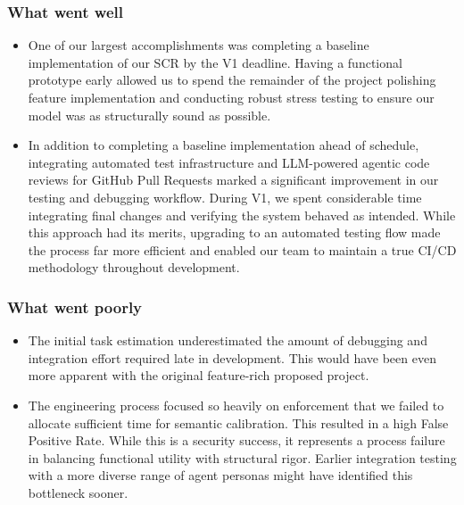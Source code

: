 \documentclass[conference]{IEEEtran}
\begin{document}
\subsubsection{\textbf{What went well}
}

\begin{itemize}
   

 \item One of our largest accomplishments was completing a baseline implementation of our SCR by the V1 deadline. Having a functional prototype early allowed us to spend the remainder of the project polishing feature implementation and conducting robust stress testing to ensure our model was as structurally sound as possible.

 \item In addition to completing a baseline implementation ahead of schedule, integrating automated test infrastructure and LLM-powered agentic code reviews for GitHub Pull Requests marked a significant improvement in our testing and debugging workflow. During V1, we spent considerable time integrating final changes and verifying the system behaved as intended. While this approach had its merits, upgrading to an automated testing flow made the process far more efficient and enabled our team to maintain a true CI/CD methodology throughout development. 

\end{itemize}
\subsubsection{\textbf{What went poorly}
}
\begin{itemize}
    \item The initial task estimation underestimated the amount of debugging and integration effort required late in development. This would have been even more apparent with the original feature-rich proposed project.
    \item The engineering process focused so heavily on enforcement that we failed to allocate sufficient time for semantic calibration. This resulted in a high False Positive Rate. While this is a security success, it represents a process failure in balancing functional utility with structural rigor. Earlier integration testing with a more diverse range of agent personas might have identified this bottleneck sooner.
\end{itemize}
\end{document}
